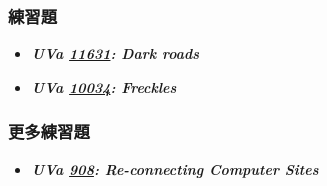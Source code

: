 \subsubsection*{練習題}
\begin{itemize}[label={\Checkmark}]
\item \textbf{\textit{UVa \href{http://uva.onlinejudge.org/external/116/11631.html}{11631}: Dark roads}}\\

\item \textbf{\textit{UVa \href{http://uva.onlinejudge.org/external/100/10034.html}{10034}: Freckles}}\\

\end{itemize}
\subsubsection*{更多練習題}
\begin{itemize}[label={\PencilLeftDown}]
\item \textbf{\textit{UVa \href{http://uva.onlinejudge.org/external/9/908.html}{908}: Re-connecting Computer Sites}}
\end{itemize}